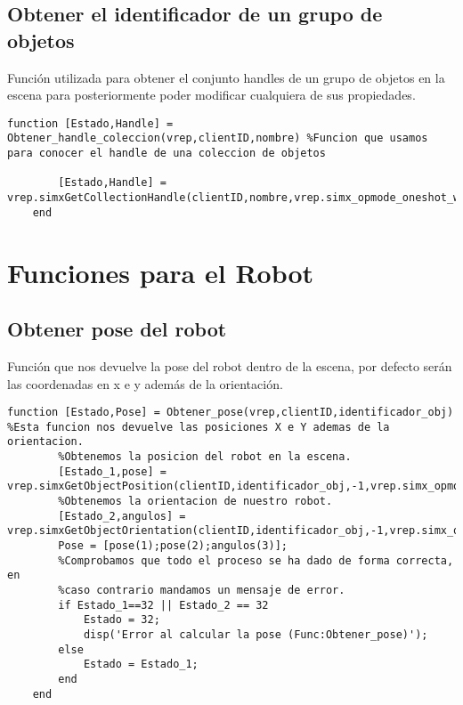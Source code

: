 \subsection{Obtener el identificador de un grupo de objetos}
Función utilizada para obtener el conjunto handles de un grupo de objetos en la escena para posteriormente poder modificar cualquiera de sus propiedades.
\begin{lstlisting}[frame=single]
function [Estado,Handle] = Obtener_handle_coleccion(vrep,clientID,nombre) %Funcion que usamos para conocer el handle de una coleccion de objetos
        
        [Estado,Handle] = vrep.simxGetCollectionHandle(clientID,nombre,vrep.simx_opmode_oneshot_wait);
    end
\end{lstlisting}
\section{Funciones para el Robot}
\subsection{Obtener pose del robot}
Función que nos devuelve la pose del robot dentro de la escena, por defecto serán las coordenadas en x e y además de la orientación.
\begin{lstlisting}[frame=single]
    function [Estado,Pose] = Obtener_pose(vrep,clientID,identificador_obj) %Esta funcion nos devuelve las posiciones X e Y ademas de la orientacion.
        %Obtenemos la posicion del robot en la escena.
        [Estado_1,pose] = vrep.simxGetObjectPosition(clientID,identificador_obj,-1,vrep.simx_opmode_oneshot_wait);
        %Obtenemos la orientacion de nuestro robot.
        [Estado_2,angulos] = vrep.simxGetObjectOrientation(clientID,identificador_obj,-1,vrep.simx_opmode_oneshot_wait);
        Pose = [pose(1);pose(2);angulos(3)];
        %Comprobamos que todo el proceso se ha dado de forma correcta, en
        %caso contrario mandamos un mensaje de error.
        if Estado_1==32 || Estado_2 == 32
            Estado = 32;
            disp('Error al calcular la pose (Func:Obtener_pose)');
        else 
            Estado = Estado_1;
        end
    end
\end{lstlisting}
